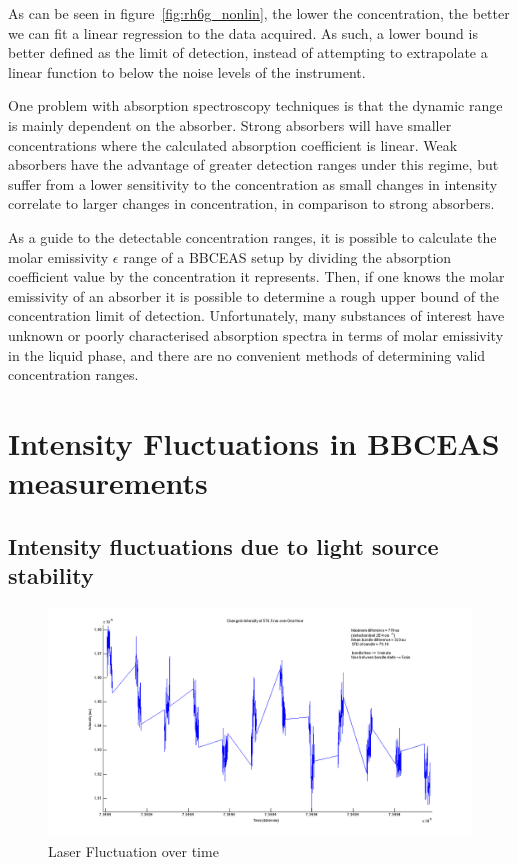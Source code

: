 As can be seen in figure~\ref{fig:rh6g_nonlin}, the lower the concentration, the
better we can fit a linear regression to the data acquired. As such, a lower
bound is better defined as the limit of detection, instead of attempting to
extrapolate a linear function to below the noise levels of the instrument.

One problem with absorption spectroscopy techniques is that the dynamic range
is mainly dependent on the absorber. Strong absorbers will have smaller
concentrations where the calculated absorption coefficient is linear. Weak
absorbers have the advantage of greater detection ranges under this regime,
but suffer from a lower sensitivity to the concentration as small changes
in intensity correlate to larger changes in concentration, in comparison to
strong absorbers.

As a guide to the detectable concentration ranges, it is possible to calculate
the molar emissivity $\epsilon$ range of a \ac{BBCEAS} setup by dividing the
absorption coefficient value by the concentration it represents. Then, if
one knows the molar emissivity of an absorber it is possible to determine a
rough upper bound of the concentration limit of detection. Unfortunately, many
substances of interest have unknown or poorly characterised absorption spectra
in terms of molar emissivity in the liquid phase, and there are no convenient
methods of determining valid concentration ranges.

\section{Intensity Fluctuations in BBCEAS measurements}\label{sec:light_fluc}


\subsection{Intensity fluctuations due to light source stability}\label{subsec:laser_fluc}

\begin{figure}[h!]
\begin{center}
\includegraphics[width=\textwidth]{figures/change_in_intensity_of_576_5nm_over_one_hour.png}
\end{center}
\caption{Laser Fluctuation over time}
\label{fig:laser_fluc}
\end{figure}

